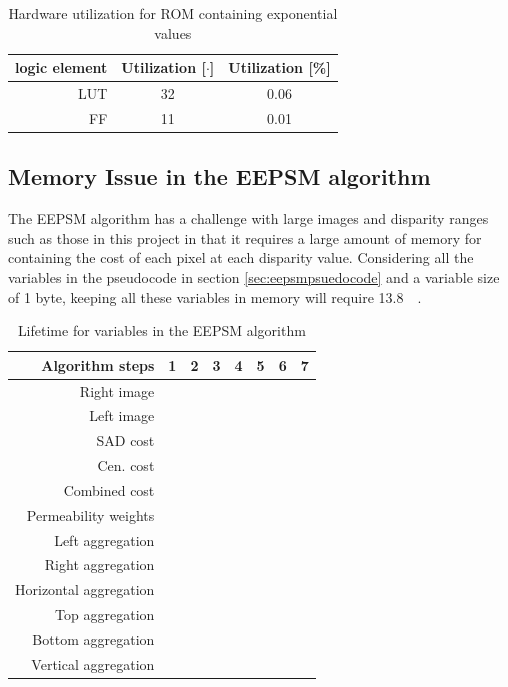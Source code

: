 \begin{table}
  \centering
  \begin{tabular}{r | c c}
   \toprule
   logic element & Utilization [$\cdot$] & Utilization [\%] \\
   \midrule
   LUT &  32 & 0.06 \\
   FF & 11 & 0.01 \\
   \bottomrule
  \end{tabular}
  \caption{Hardware utilization for ROM containing exponential values}
  \label{tab:exputili}
\end{table}

\subsection{Memory Issue in the EEPSM algorithm}
The EEPSM algorithm has a challenge with large images and disparity ranges such as those in this project in that it requires a large amount of memory for containing the cost of each pixel at each disparity value. Considering all the variables in the pseudocode in section \vref{sec:eepsmpsuedocode} and a variable size of 1 byte, keeping all these variables in memory will require \SI{13.8}{\giga\byte}. \\
\begin{table}[ht!]
  \centering
  \begin{tabular}{r | c | c | c | c | c | c | c |}
    Algorithm steps & 1 & 2 & 3 & 4 & 5 & 6 & 7 \\
    \hline
    Right image & \cellcolor{gray} &  \cellcolor{gray} &  \cellcolor{gray} & & & & \\
    Left image & \cellcolor{gray} &  \cellcolor{gray} &  \cellcolor{gray} & & & & \\
    SAD cost & \cellcolor{gray} & \cellcolor{gray} & & & & &  \\
    Cen. cost & \cellcolor{gray} & \cellcolor{gray} & & & & &  \\
    Combined cost & & \cellcolor{gray} & \cellcolor{gray} & \cellcolor{gray} & & & \\
    Permeability weights & & & \cellcolor{gray} & \cellcolor{gray} & \cellcolor{gray} & \cellcolor{gray} & \\
    Left aggregation & & & & \cellcolor{gray} & \cellcolor{gray} & & \\
    Right aggregation & & & & \cellcolor{gray} & \cellcolor{gray} & & \\
    Horizontal aggregation & & & & & \cellcolor{gray} & \cellcolor{gray} & \\
    Top aggregation & & & & & & \cellcolor{gray} & \cellcolor{gray} \\
    Bottom aggregation & & & & & & \cellcolor{gray} & \cellcolor{gray} \\
    Vertical aggregation & & & & & & & \cellcolor{gray} 
  \end{tabular}
  \caption{Lifetime for variables in the EEPSM algorithm \label{tab:memuse}}
\end{table}

